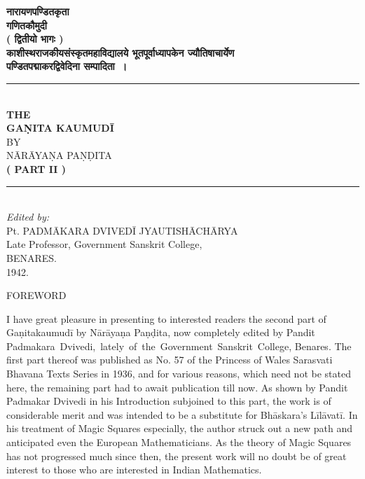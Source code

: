 \documentclass[11pt, openany]{book}
\begin{document}
\begin{center}
\textbf{\large नारायणपण्डितकृता\\}
\vspace{7mm}
\textbf{\huge गणितकौमुदी\\}
\vspace{5mm}
\textbf{( द्वितीयो भागः )\\}
\vspace{5mm}
\textbf{\small काशीस्थराजकीयसंस्कृतमहाविद्यालये भूतपूर्वाध्यापकेन ज्यौतिषाचार्येण\\}
\textbf{\small पण्डितपद्माकरद्विवेदिना सम्पादिता~। \\}
\vspace{10mm}
\rule{0.15\linewidth}{0.5pt}\\
\vspace{10mm}
\textbf{\LARGE THE \\}
\vspace{2mm}
\textbf{\LARGE GAṆITA KAUMUDĪ\\}
\vspace{3mm}
BY\\
\vspace{2mm}
NĀRĀYAṆA PAṆḌITA\\
\vspace{2mm}
\textbf{( PART II ) \\}
\vspace{7mm}
\rule{0.15\linewidth}{0.5pt}\\
\vspace{7mm}
{\onehalfspacing
\textenglish{\emph{Edited by:}} \\
Pt. PADMĀKARA DVIVEDĪ JYAUTISHĀCHĀRYA \\
Late Professor, Government Sanskrit College, \\
BENARES. \\
1942. }
\end{center}
\thispagestyle{empty}
\newpage
\thispagestyle{empty}
\begin{center}
{\Large FOREWORD }
\end{center}

I have great pleasure in presenting to interested readers the second part of Gaṇitakaumudī by Nārāyaṇa Paṇḍita, now completely 
edited by Pandit \,Padmakara \,Dvivedi, \,lately \,of \,the \,Government \,Sanskrit \,College, Benares. The 
first part thereof was published as No. 57 of 
the Princess of Wales Sarasvati Bhavana Texts 
Series in 1936, and for various reasons, which 
need not be stated here, the remaining part had 
to await publication till now. As shown by 
Pandit Padmakar Dvivedi in his Introduction 
subjoined to this part, the work is of considerable merit and was intended to be a substitute 
for Bhāskara's Līlāvatī. In his treatment of 
Magic Squares especially, the author struck out 
a new path and anticipated even the European 
Mathematicians. As the theory of Magic 
Squares has not progressed much since then, 
the present work will no doubt be of great 
interest to those who are interested in Indian 
Mathematics. \\
\end{document}
